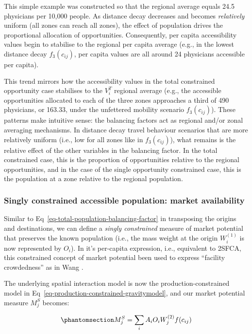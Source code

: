 \documentclass[
  10pt,
  letterpaper,
]{article}
\begin{document}
This simple example was constructed so that the regional average equals
24.5 physicians per 10,000 people. As distance decay decreases and
becomes \emph{relatively} uniform (all zones can reach all zones), the
effect of population drives the proportional allocation of
opportunities. Consequently, per capita accessibility values begin to
stabilise to the regional per capita average (e.g., in the lowest
distance decay \(f_3(c_{ij})\), per capita values are all around 24
physicians accessible per capita).

This trend mirrors how the accessibility values in the total constrained
opportunity case stabilises to the \(V_i^T\) regional average (e.g., the
accessible opportunities allocated to each of the three zones approaches
a third of 490 physicians, or 163.33, under the unfettered mobility
scenario \(f_3(c_{ij})\)). These patterns make intuitive sense: the
balancing factors act as regional and/or zonal averaging mechanisms. In
distance decay travel behaviour scenarios that are more relatively
uniform (i.e., low for all zones like in \(f_3(c_{ij})\)), what remains
is the relative effect of the other variables in the balancing factor.
In the total constrained case, this is the proportion of opportunities
relative to the regional opportunities, and in the case of the single
opportunity constrained case, this is the population at a zone relative
to the regional population.

\subsubsection{Singly constrained accessible population: market
availability}\label{singly-constrained-accessible-population-market-availability}

Similar to Eq~\ref{eq-total-population-balancing-factor} in transposing
the origins and destinations, we can define a \emph{singly constrained}
measure of market potential that preserves the known population (i.e.,
the mass weight at the origin \(W_i^{(1)}\) is now represented by
\(O_i\)). In it's per-capita expression, i.e., equivalent to 2SFCA, this
constrained concept of market potential been used to express ``facility
crowdedness'' as in Wang \citep{wang_inverted_2018}.

The underlying spatial interaction model is now the
production-constrained model in
Eq~\ref{eq-production-constrained-gravitymodel}, and our market
potential measure \(M^S_j\) becomes:

\begin{equation}\phantomsection\label{eq-population-constrained-accessibility}{
M^S_j = \sum_i A_i O_i W_j^{(2)} f(c_{ij})
}\end{equation}
\end{document}
